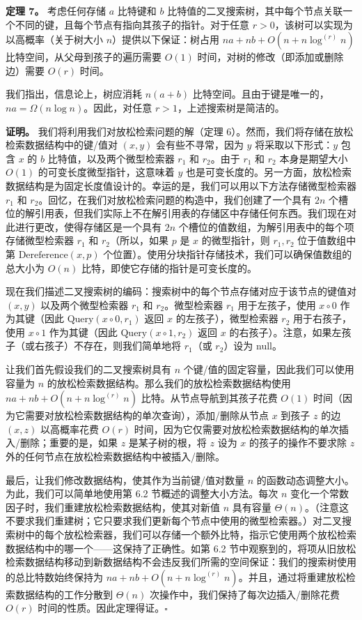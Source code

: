 \documentclass[12pt,a4paper]{ctexart}
\theoremstyle{remark}
\begin{document}
\textbf{定理 7。} 考虑任何存储 $a$ 比特键和 $b$ 比特值的二叉搜索树，其中每个节点关联一个不同的键，且每个节点有指向其孩子的指针。对于任意 $r>0$，该树可以实现为以高概率（关于树大小 $n$）提供以下保证：树占用 $na+nb+O(n+n\log^{(r)}n)$ 比特空间，从父母到孩子的遍历需要 $O(1)$ 时间，对树的修改（即添加或删除边）需要 $O(r)$ 时间。

我们指出，信息论上，树应消耗 $n(a+b)$ 比特空间。且由于键是唯一的，$na=\Omega(n\log n)$。因此，对任意 $r>1$，上述搜索树是简洁的。

\textbf{证明。} 我们将利用我们对放松检索问题的解（定理 6）。然而，我们将存储在放松检索数据结构中的键/值对 $(x,y)$ 会有些不寻常，因为 $y$ 将采取以下形式：$y$ 包含 $x$ 的 $b$ 比特值，以及两个微型检索器 $r_1$ 和 $r_2$。由于 $r_1$ 和 $r_2$ 本身是期望大小 $O(1)$ 的可变长度微型指针，这意味着 $y$ 也是可变长度的。另一方面，放松检索数据结构是为固定长度值设计的。幸运的是，我们可以用以下方法存储微型检索器 $r_1$ 和 $r_2$。回忆，在我们对放松检索问题的构造中，我们创建了一个具有 $2n$ 个槽位的解引用表，但我们实际上不在解引用表的存储区中存储任何东西。我们现在对此进行更改，使得存储区是一个具有 $2n$ 个槽位的值数组，为解引用表中的每个项存储微型检索器 $r_1$ 和 $r_2$（所以，如果 $p$ 是 $x$ 的微型指针，则 $r_1,r_2$ 位于值数组中第 $\text{Dereference}(x,p)$ 个位置）。使用分块指针存储技术，我们可以确保值数组的总大小为 $O(n)$ 比特，即使它存储的指针是可变长度的。

现在我们描述二叉搜索树的编码：搜索树中的每个节点存储对应于该节点的键值对 $(x,y)$ 以及两个微型检索器 $r_1$ 和 $r_2$。微型检索器 $r_1$ 用于左孩子，使用 $x\circ 0$ 作为其键（因此 $\text{Query}(x\circ 0,r_1)$ 返回 $x$ 的左孩子），微型检索器 $r_2$ 用于右孩子，使用 $x\circ 1$ 作为其键（因此 $\text{Query}(x\circ 1,r_2)$ 返回 $x$ 的右孩子）。注意，如果左孩子（或右孩子）不存在，则我们简单地将 $r_1$（或 $r_2$）设为 null。

让我们首先假设我们的二叉搜索树具有 $n$ 个键/值的固定容量，因此我们可以使用容量为 $n$ 的放松检索数据结构。那么我们的放松检索数据结构使用 $na+nb+O(n+n\log^{(r)}n)$ 比特。从节点导航到其孩子花费 $O(1)$ 时间（因为它需要对放松检索数据结构的单次查询），添加/删除从节点 $x$ 到孩子 $z$ 的边 $(x,z)$ 以高概率花费 $O(r)$ 时间，因为它仅需要对放松检索数据结构的单次插入/删除；重要的是，如果 $z$ 是某子树的根，将 $z$ 设为 $x$ 的孩子的操作不要求除 $z$ 外的任何节点在放松检索数据结构中被插入/删除。

最后，让我们修改数据结构，使其作为当前键/值对数量 $n$ 的函数动态调整大小。为此，我们可以简单地使用第 6.2 节概述的调整大小方法。每次 $n$ 变化一个常数因子时，我们重建放松检索数据结构，使其对新值 $n$ 具有容量 $\Theta(n)$。（注意这不要求我们重建树；它只要求我们更新每个节点中使用的微型检索器。）对二叉搜索树中的每个放松检索器，我们可以存储一个额外比特，指示它使用两个放松检索数据结构中的哪一个——这保持了正确性。如第 6.2 节中观察到的，将项从旧放松检索数据结构移动到新数据结构不会违反我们所需的空间保证：我们的搜索树使用的总比特数始终保持为 $na+nb+O(n+n\log^{(r)}n)$。并且，通过将重建放松检索数据结构的工作分散到 $\Theta(n)$ 次操作中，我们保持了每次边插入/删除花费 $O(r)$ 时间的性质。因此定理得证。$\square$
\end{document}
